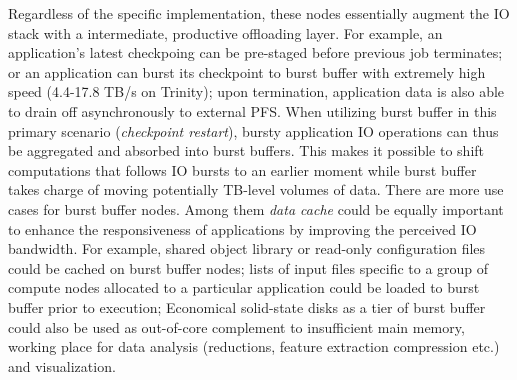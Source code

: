 Regardless of the specific implementation, these nodes essentially augment
the IO stack with a intermediate, productive offloading layer.
For example, an application's latest checkpoing can be pre-staged
before previous job terminates;
or an application can burst its checkpoint to burst buffer
with extremely high speed (4.4-17.8 TB/s on Trinity);
upon termination, application data is also able to drain off
asynchronously to external PFS.
When utilizing burst buffer in this primary scenario (\textit{checkpoint restart}),
bursty application IO operations can thus be aggregated and absorbed into burst buffers.
This makes it possible to shift computations that follows IO bursts to an earlier moment
while burst buffer takes charge of moving potentially TB-level volumes of data.
There are more use cases for burst buffer nodes.
Among them \textit{data cache} could be equally important to enhance the responsiveness
of applications by improving the perceived IO bandwidth\cite{BBUseCase}.
For example, shared object library or read-only configuration files could be
cached on burst buffer nodes;
lists of input files specific to a group of compute nodes allocated to
a particular application could be loaded to burst buffer prior to execution;
Economical solid-state disks as a tier of burst buffer could also be used as
out-of-core complement to insufficient main memory\cite{Romanus:CORR:15},
working place for data analysis (reductions, feature extraction compression etc.)
and visualization\cite{BBUseCase}.


